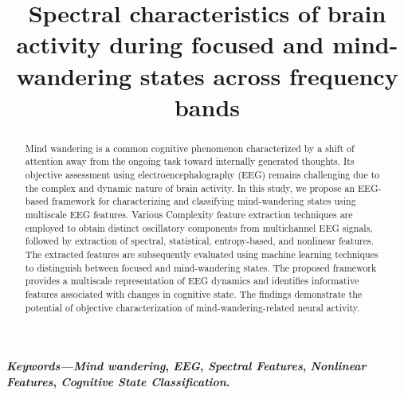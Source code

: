 \documentclass[conference]{IEEEtran}
\begin{document}
\title{Spectral characteristics of brain activity during focused and mind-wandering states across frequency bands \vspace{-4mm}
}

\author{

}

\maketitle 
\begin{abstract}
 Mind wandering is a common cognitive phenomenon characterized by a shift of attention away from the ongoing task toward internally generated thoughts. Its objective assessment using electroencephalography (EEG) remains challenging due to the complex and dynamic nature of brain activity. In this study, we propose an EEG-based framework for characterizing and classifying mind-wandering states using multiscale EEG features. Various Complexity feature extraction techniques are employed to obtain distinct oscillatory components from multichannel EEG signals, followed by extraction of spectral, statistical, entropy-based, and nonlinear features. The extracted features are subsequently evaluated using machine learning techniques to distinguish between focused and mind-wandering states. The proposed framework provides a multiscale representation of EEG dynamics and identifies informative features associated with changes in cognitive state. The findings demonstrate the potential of objective characterization of mind-wandering-related neural activity.

\end{abstract}
\textbf{\textit{Keywords---}\textit{Mind wandering}, \textit{EEG}, \textit{Spectral Features}, \textit{Nonlinear Features}, \textit{Cognitive State Classification}.}
 
\end{document}
